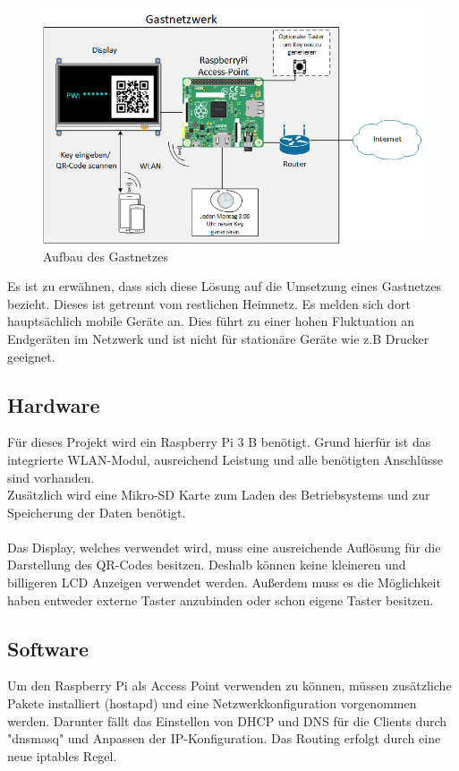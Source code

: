 \documentclass[a4paper,11pt,singlespacing]{article}
\begin{document}
		\begin{figure}[ht]
			\centering
			\includegraphics[scale=0.6]{skizze}
				\caption{Aufbau des Gastnetzes}
				\label{aufbau}
		\end{figure}

    	Es ist zu erwähnen, dass sich diese Lösung auf die Umsetzung eines Gastnetzes bezieht. Dieses ist getrennt vom restlichen Heimnetz. Es melden sich dort hauptsächlich mobile Geräte an. Dies führt zu einer hohen Fluktuation an Endgeräten im Netzwerk und ist nicht für stationäre Geräte wie z.B Drucker geeignet.
    
    
    	\subsection{Hardware}
			Für dieses Projekt wird ein Raspberry Pi 3 B benötigt. Grund hierfür ist das integrierte WLAN-Modul, ausreichend Leistung und alle benötigten Anschlüsse sind vorhanden. \\
			Zusätzlich wird eine Mikro-SD Karte zum Laden des Betriebsystems und zur Speicherung der Daten benötigt. \\ \\
			Das Display, welches verwendet wird, muss eine ausreichende Auflösung für die Darstellung des QR-Codes besitzen. Deshalb können keine kleineren und billigeren LCD Anzeigen verwendet werden. Außerdem muss es die Möglichkeit haben entweder externe Taster anzubinden oder schon eigene Taster besitzen.
		
		\subsection{Software}
			Um den Raspberry Pi als Access Point verwenden zu können, müssen zusätzliche Pakete installiert (hostapd) und eine Netzwerkkonfiguration vorgenommen werden. Darunter fällt das Einstellen von DHCP und DNS für die Clients durch "dnsmasq" und Anpassen der IP-Konfiguration. Das Routing erfolgt durch eine neue iptables Regel.\\ \\
		
\end{document}
